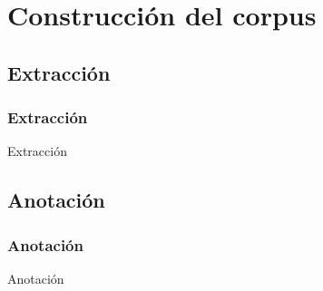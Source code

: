 \section{Construcción del corpus}

\subsection{Extracción}
\begin{frame}
    \frametitle{Extracción}
    Extracción
\end{frame}

\subsection{Anotación}
\begin{frame}
    \frametitle{Anotación}
    Anotación
\end{frame}
